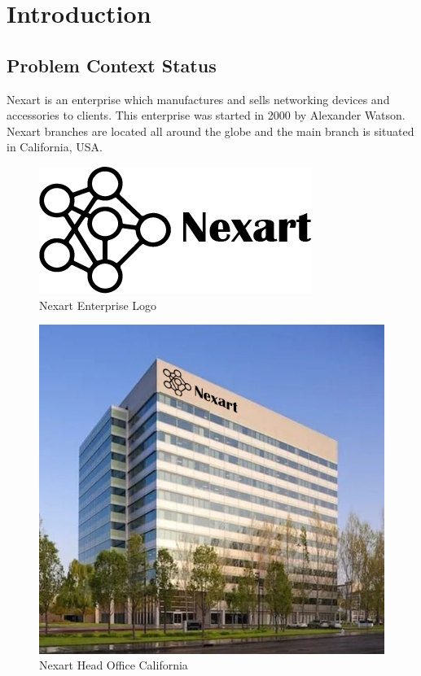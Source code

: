 \documentclass[a4Paper,12pt]{report}
\begin{document}
\chapter{Introduction}
\section{Problem Context Status}
Nexart is an enterprise which manufactures and sells networking devices and accessories to clients. This enterprise was started in 2000 by Alexander Watson. Nexart branches are located all around the globe and the main branch is situated in California, USA.
\begin{figure}[H]
\centering
\includegraphics[scale=0.4]{images/nexart_trademark.png}
\caption{Nexart Enterprise Logo}
\end{figure}
\begin{figure}[H]
\centering
\includegraphics[scale=0.4]{images/nexart_office.jpg}
\caption{Nexart Head Office California}
\end{figure}
\end{document}

